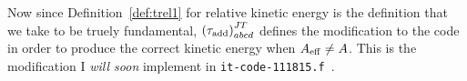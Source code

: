 \documentclass{article}
\def\aeff{A_{\rm{eff}}}
\begin{document}
Now since Definition~\ref{def:trel1} for relative kinetic energy is the
definition that we take to be truely fundamental,
${(\tau_{\rm{add}})}_{abcd}^{JT}$ defines
the modification to the code in order to produce the correct
kinetic energy when $\aeff\neq A$.
This is the modification I \textit{will soon} implement in
\texttt{it-code-111815.f}~\cite{github}.



\end{document}
